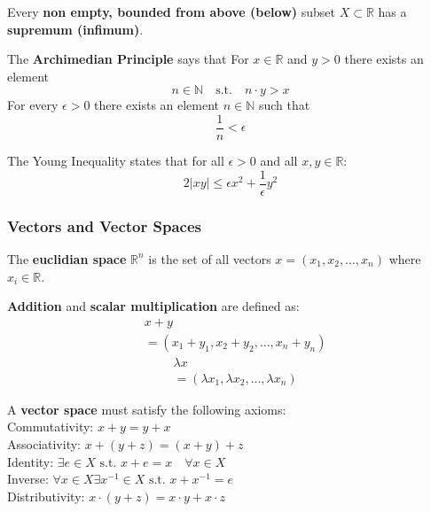 \begin{theorem}
    Every \textbf{non empty, bounded from above (below)} subset $X \subset \mathbb{R}$ has a \textbf{supremum (infimum)}.
\end{theorem}

\begin{theorem}
    The \textbf{Archimedian Principle} says that
    For $x \in \mathbb{R}$ and $y \gt 0$ there exists an element 
    $$n \in \mathbb{N} \quad \text{s.t.} \quad n \cdot y \gt x$$
    For every $\epsilon \gt 0$ there exists an element $n \in \mathbb{N}$ such that
    $$\frac{1}{n} \lt \epsilon$$
\end{theorem}

\begin{theorem}
    The Young Inequality states that for all $\epsilon \gt 0$ and all $x, y \in \mathbb{R}$:
    $$2\lvert xy \rvert \leq \epsilon x^2 + \frac{1}{\epsilon} y^2$$
\end{theorem}

\subsubsection{Vectors and Vector Spaces}

\begin{definition}

    The \textbf{euclidian space} $\mathbb{R}^n$ is the set of all vectors $x = (x_1, x_2, \dots, x_n)$ where $x_i \in \mathbb{R}$.

\end{definition}

\begin{definition}

    \textbf{Addition} and \textbf{scalar multiplication} are defined as:
    \begin{align*}
& x + y \\
&= (x_1 + y_1, x_2 + y_2, \dots, x_n + y_n)
\end{align*}
    \begin{align*}
& \lambda x \\
&= (\lambda x_1, \lambda x_2, \dots, \lambda x_n)
\end{align*}

\end{definition}

\begin{definition}
    A \textbf{vector space} must satisfy the following axioms: \\
    Commutativity: $x + y = y + x$ \\
    Associativity: $x + (y + z) = (x + y) + z$ \\
    Identity: $\exists e \in X \text{ s.t. } x + e = x \quad \forall x \in X$ \\
    Inverse: $\forall x \in X \exists x^{-1} \in X \text{ s.t. } x + x^{-1} = e$ \\
    Distributivity: $x \cdot (y + z) = x \cdot y + x \cdot z$
\end{definition}

